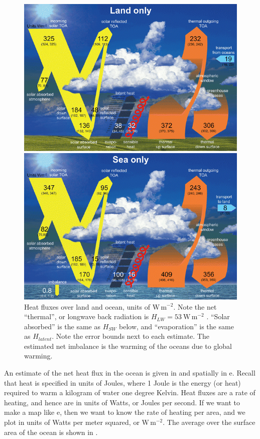 \begin{figure}[hbt]
  \begin{center}
    \includegraphics{figs/FluxesFigs/382_2014_2430_Fig2_HTML}
    \caption{Heat fluxes over land and ocean, units of $\mathrm{W\,m^{-2}}$.  Note the net ``thermal'', or longwave back radiation is $H_{LW} = 53\ \mathrm{W\,m^{-2}}$ \citep{wildetal15}.  ``Solar absorbed'' is the same as $H_{SW}$ below, and ``evaporation'' is the same as $H_{latent}$.  Note the error bounds next to each estimate.  The estimated net imbalance is the warming of the oceans due to global warming.  }
    \label{fig:382_2014_2430_Fig2_HTML}  
  \end{center}
\end{figure}

An estimate of the net heat flux in the ocean is given in  and spatially in e.  Recall that heat is specified in units of Joules, where 1 Joule is the energy (or heat) required to warm a kilogram of water one degree Kelvin.  Heat fluxes are a rate of heating, and hence are in units of Watts, or Joules per second.  If we want to make a map like e, then we want to know the rate of heating per area, and we plot in units of Watts per meter squared, or $\mathrm{W\,m^{-2}}$.  The average over the surface area of the ocean is shown in .  

